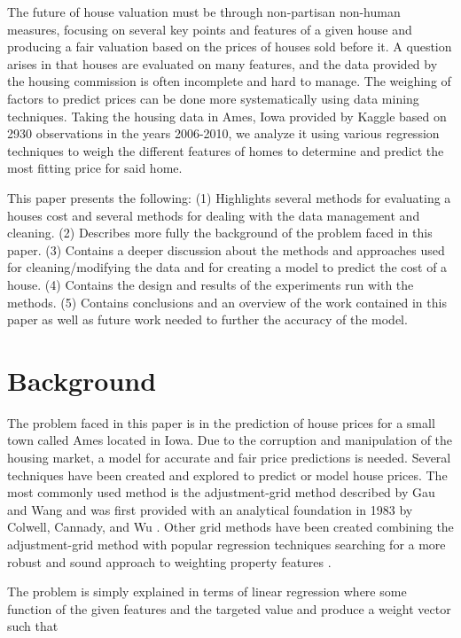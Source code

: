 \documentclass[fleqn,10pt]{SelfArx} %
\begin{document}
The future of house valuation must be through non-partisan non-human measures, focusing on several key points and features of a given house and producing a fair valuation
based on the prices of houses sold before it. A question arises in that houses are evaluated on many features, and the data provided by the housing commission is often
incomplete and hard to manage. The weighing of factors to predict prices can be done more systematically using data mining techniques.  Taking the housing data in Ames,
Iowa provided by Kaggle based on 2930 observations in the years 2006-2010, we analyze it using various regression techniques to weigh the different features of homes to 
determine and predict the most fitting price for said home.

This paper presents the following: (1) Highlights several methods for evaluating a houses cost and several methods for dealing with the data management and cleaning. (2) Describes more fully the background of the problem faced in this paper. (3) Contains a deeper discussion about the methods and approaches used for cleaning/modifying the data and for creating a model to predict
the cost of a house. (4) Contains the design and results of the experiments run with the methods. (5) Contains conclusions and an overview of the work contained in this paper
as well as future work needed to further the accuracy of the model.




\section{Background}

The problem faced in this paper is in the prediction of house prices for a small town called Ames located in Iowa. Due to the corruption and manipulation of the housing market,
a model for accurate and fair price predictions is needed. Several techniques have been created and explored to predict or model house prices. The most commonly used 
method is the adjustment-grid method \cite{lentz2009residential} described by Gau and Wang and was first provided with an analytical foundation in 1983 by Colwell, Cannady, and 
Wu \cite{REEC:REEC277}. Other grid methods have been created combining the adjustment-grid method with popular regression techniques searching for a more robust and 
sound approach to weighting property features \cite{gau1992optimal}.

The problem is simply explained in terms of linear regression \cite{montgomery2015introduction} where some function of the given features and the 
targeted value and produce a weight vector such that
\end{document}
